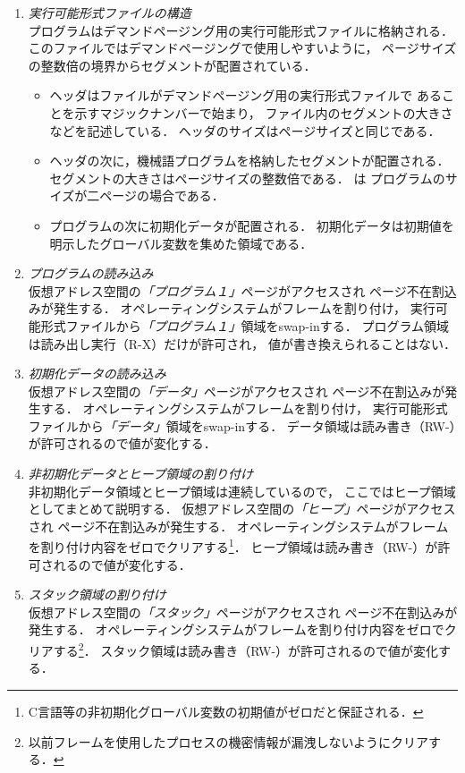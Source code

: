 \begin{enumerate}
\item \emph{実行可能形式ファイルの構造} \\
  プログラムはデマンドページング用の実行可能形式ファイルに格納される．
  このファイルではデマンドページングで使用しやすいように，
  ページサイズの整数倍の境界からセグメントが配置されている．
  \begin{itemize}
  \item ヘッダはファイルがデマンドページング用の実行形式ファイルで
    あることを示すマジックナンバーで始まり，
    ファイル内のセグメントの大きさなどを記述している．
    ヘッダのサイズはページサイズと同じである．
  \item ヘッダの次に，機械語プログラムを格納したセグメントが配置される．
    セグメントの大きさはページサイズの整数倍である．
    は
    プログラムのサイズが二ページの場合である．
  \item プログラムの次に初期化データが配置される．
    初期化データは初期値を明示したグローバル変数を集めた領域である．
  \end{itemize}
\item \emph{プログラムの読み込み} \\
  仮想アドレス空間の\emph{「プログラム１」}ページがアクセスされ
  ページ不在割込みが発生する．
  オペレーティングシステムがフレームを割り付け，
  実行可能形式ファイルから\emph{「プログラム１」}領域をswap-inする．
  プログラム領域は読み出し実行（R-X）だけが許可され，
  値が書き換えられることはない．
\item \emph{初期化データの読み込み} \\
  仮想アドレス空間の\emph{「データ」}ページがアクセスされ
  ページ不在割込みが発生する．
  オペレーティングシステムがフレームを割り付け，
  実行可能形式ファイルから\emph{「データ」}領域をswap-inする．
  データ領域は読み書き（RW-）が許可されるので値が変化する．
\item \emph{非初期化データとヒープ領域の割り付け} \\
  非初期化データ領域とヒープ領域は連続しているので，
  ここではヒープ領域としてまとめて説明する．
  仮想アドレス空間の\emph{「ヒープ」}ページがアクセスされ
  ページ不在割込みが発生する．
  オペレーティングシステムがフレームを割り付け内容をゼロでクリアする\footnote{
  C言語等の非初期化グローバル変数の初期値がゼロだと保証される．}．
  ヒープ領域は読み書き（RW-）が許可されるので値が変化する．
\item \emph{スタック領域の割り付け} \\
  仮想アドレス空間の\emph{「スタック」}ページがアクセスされ
  ページ不在割込みが発生する．
  オペレーティングシステムがフレームを割り付け内容をゼロでクリアする\footnote{
  以前フレームを使用したプロセスの機密情報が漏洩しないようにクリアする．}．
  スタック領域は読み書き（RW-）が許可されるので値が変化する．
\end{enumerate}

